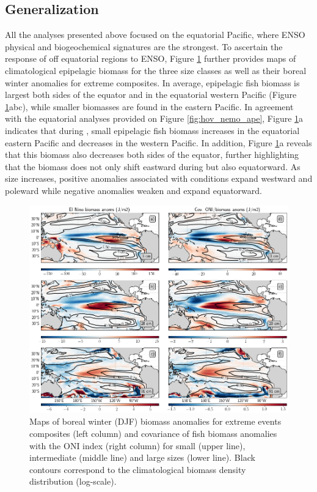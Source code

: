\subsection{Generalization}

All the analyses presented above focused on the equatorial Pacific, where ENSO physical and biogeochemical signatures are the strongest. To ascertain the response of off equatorial regions to ENSO,  Figure \ref{fig:mean_ond97_ape} further provides maps of climatological epipelagic biomass for the three size classes as well as their boreal winter anomalies for extreme \nino{} composites.  In average, epipelagic fish biomass is largest both sides of the equator and in the equatorial western Pacific (Figure \ref{fig:mean_ond97_ape}abc), while smaller biomasses  are found in the eastern Pacific. In agreement with the equatorial analyses provided on Figure \ref{fig:hov_nemo_ape}, Figure \ref{fig:mean_ond97_ape}a indicates that during \nino{}, small epipelagic fish biomass increases in the equatorial eastern Pacific and decreases in the western Pacific. In addition, Figure \ref{fig:mean_ond97_ape}a reveals that this biomass also decreases both sides of the equator, further highlighting that the biomass does not only shift eastward during \nino{} but also equatorward.
As size increases, positive anomalies associated with \nino{} conditions expand westward and poleward while negative anomalies weaken and expand equatorward. 

\begin{figure}[h!tp]
	\centering
	\includegraphics[scale=0.4]{figs/map_mean_anom_OND_97.png}	
	\caption{Maps of boreal winter (DJF) biomass anomalies for extreme \nino{} events composites (left column) and covariance of fish biomass anomalies with the ONI index (right column) for small (upper line), intermediate (middle line) and large sizes (lower line). Black contours correspond to the climatological biomass density distribution (log-scale).}	
	\label{fig:mean_ond97_ape}
\end{figure}


